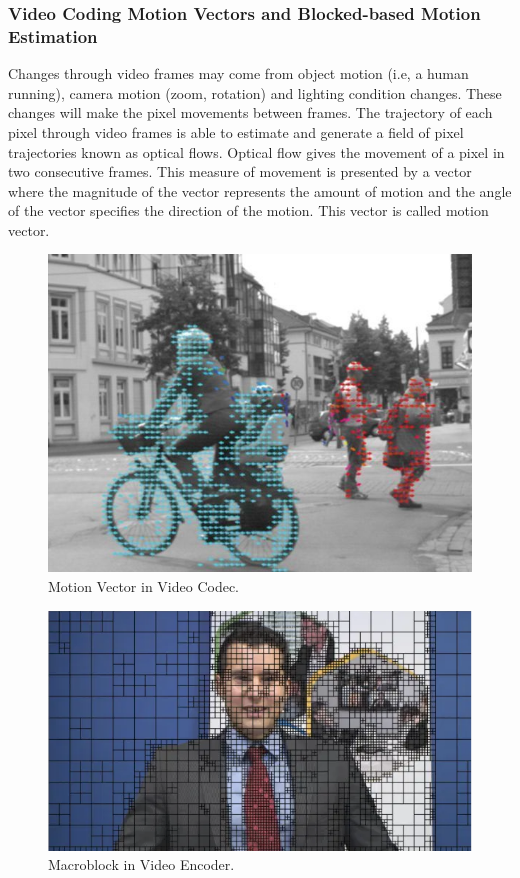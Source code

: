 \subsubsection{Video Coding Motion Vectors and Blocked-based Motion Estimation}
	Changes through video frames may come from object motion (i.e, a human running), camera motion (zoom, rotation) and lighting condition changes.  These changes will make the pixel movements between frames. The trajectory of each pixel through video frames is able to estimate and generate a field of pixel trajectories known as optical flows. Optical flow gives the movement of a pixel in two consecutive frames. This measure of movement is presented by a vector where the magnitude of the vector represents the amount of motion and the angle of the vector specifies the direction of the motion. This vector is called motion vector. 
\begin{figure}
\centering
 \includegraphics[width=0.8\linewidth]{Figures/opticalflow.jpeg}
 \caption{Motion Vector in Video Codec.}
 \label{fig:opticalflow}
\end{figure}
\begin{figure}
\centering
 \includegraphics[width=0.8\linewidth]{Figures/macroblock.png}
 \caption{Macroblock in Video Encoder.}
 \label{fig:macroblock}
\end{figure}
